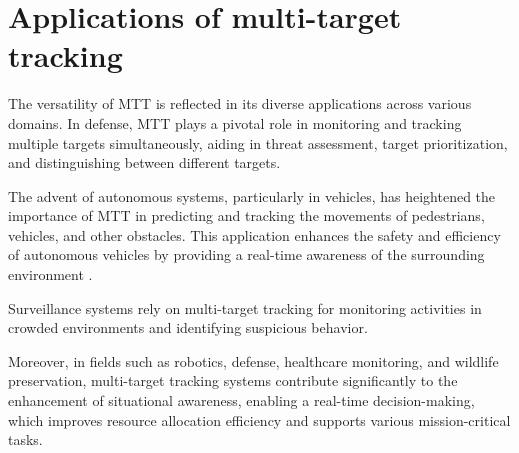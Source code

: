 
\section{Applications of multi-target tracking}
The versatility of MTT is reflected in its diverse applications across various domains. In defense, MTT plays a
pivotal role in monitoring and tracking multiple targets simultaneously, aiding in threat assessment, target
prioritization, and distinguishing between different targets.

The advent of autonomous systems, particularly in vehicles, has heightened the importance of MTT in predicting and
tracking the movements of pedestrians, vehicles, and other obstacles. This application enhances the safety and
efficiency of autonomous vehicles by providing a real-time awareness of the surrounding environment \cite{milan2016}.

Surveillance systems rely on multi-target tracking for monitoring activities in crowded environments and identifying
suspicious behavior.

Moreover, in fields such as robotics, defense, healthcare monitoring, and wildlife preservation, multi-target
tracking systems contribute significantly to the enhancement of situational awareness, enabling a real-time
decision-making, which improves resource allocation efficiency and supports various mission-critical tasks.


